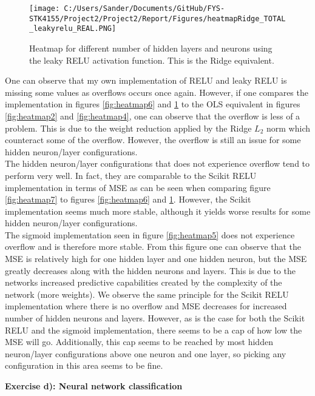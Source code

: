 \documentclass[12pt,a4paper]{article}
\begin{document}
\begin{figure}[H]
\centering
\texttt{[image: C:/Users/Sander/Documents/GitHub/FYS-STK4155/Project2/Project2/Report/Figures/heatmapRidge\_TOTAL\_leakyrelu\_REAL.PNG]}
\caption{\label{fig:heatmap8} Heatmap for different number of hidden layers and neurons using the leaky RELU activation function. This is the Ridge equivalent.}
\end{figure}

\noindent One can observe that my own implementation of RELU and leaky RELU is missing some values as overflows occurs once again. However, if one compares the implementation in figures \ref{fig:heatmap6} and \ref{fig:heatmap8} to the OLS equivalent in figures \ref{fig:heatmap2} and \ref{fig:heatmap4}, one can observe that the overflow is less of a problem. This is due to the weight reduction applied by the Ridge $L_2$ norm which counteract some of the overflow. However, the overflow is still an issue for some hidden neuron/layer configurations. 
\\
The hidden neuron/layer configurations that does not experience overflow tend to perform very well. In fact, they are comparable to the Scikit RELU implementation in terms of MSE as can be seen when comparing figure \ref{fig:heatmap7} to figures \ref{fig:heatmap6} and \ref{fig:heatmap8}. However, the Scikit implementation seems much more stable, although it yields worse results for some hidden neuron/layer configurations.
\\
The sigmoid implementation seen in figure \ref{fig:heatmap5} does not experience overflow and is therefore more stable. From this figure one can observe that the MSE is relatively high for one hidden layer and one hidden neuron, but the MSE greatly decreases along with the hidden neurons and layers. This is due to the networks increased predictive capabilities created by the complexity of the network (more weights). We observe the same principle for the Scikit RELU implementation where there is no overflow and MSE decreases for increased number of hidden neurons and layers. However, as is the case for both the Scikit RELU and the sigmoid implementation, there seems to be a cap of how low the MSE will go. Additionally, this cap seems to be reached by most hidden neuron/layer configurations above one neuron and one layer, so picking any configuration in this area seems to be fine.

\newpage

\begin{center}
\Large{\textbf{Exercise d): Neural network classification}}
\end{center}
\end{document}
